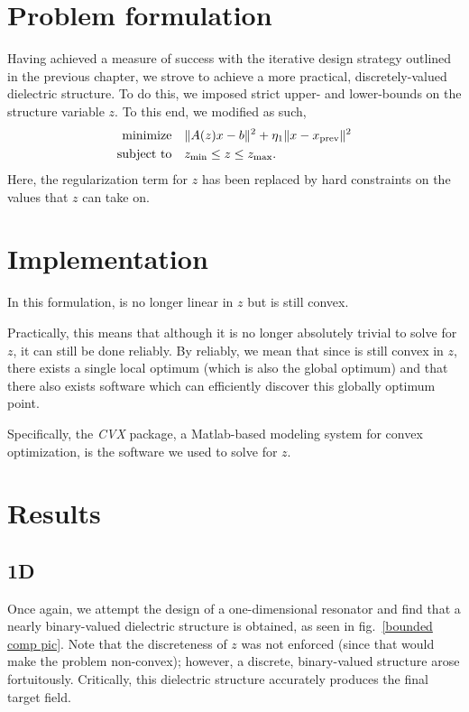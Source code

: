 \section{Problem formulation}
Having achieved a measure of success with the iterative design strategy
    outlined in the previous chapter,
    we strove 
    to achieve a more practical, discretely-valued dielectric structure. 
To do this, we imposed strict upper- and lower-bounds on the structure variable $z$. 
To this end, we modified  as such,
    \begin{subequations}
    \begin{align} 
    \operatorname*{\text{minimize}\quad} & \|A(z)x - b\|^2 + \eta_1\|x - x_\text{prev}\|^2\\
    \text{subject to}\quad & z_\text{min} \le z \le z_\text{max}. 
    \end{align}\label{bounded problem}
    \end{subequations}
Here, the regularization term for $z$ has been replaced by hard constraints
    on the values that $z$ can take on.

\section{Implementation} 
In this formulation,  is no longer linear in $z$
    but is still convex\cite{Boyd04}.

Practically, this means that although it is no longer absolutely trivial
    to solve  for $z$, it can still be done reliably.
By reliably, we mean that since  is still convex in $z$,
    there exists a single local optimum (which is also the global optimum)
    and that there also exists software which can efficiently
    discover this globally optimum point.

Specifically, the \emph{CVX} package\cite{Grant09}, 
    a Matlab-based modeling system for convex optimization, 
    is the software we used to solve  for $z$.

\section{Results}
\subsection{1D}
Once again, we attempt the design of a one-dimensional resonator
    and find that a nearly binary-valued dielectric structure is obtained,
    as seen in fig.~\ref{bounded comp pic}\cite{Lu10}.
Note that the discreteness of $z$ was not enforced (since that would make the problem non-convex); 
    however, a discrete, binary-valued structure arose fortuitously. 
Critically, this dielectric structure accurately produces the final target field. 

